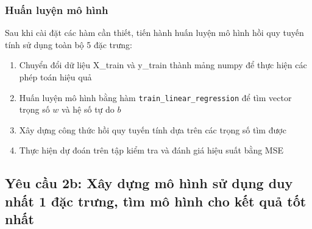 \subsubsection{Huấn luyện mô hình}
Sau khi cài đặt các hàm cần thiết, tiến hành huấn luyện mô hình hồi quy tuyến tính sử dụng toàn bộ 5 đặc trưng:

\begin{enumerate}
	\item Chuyển đổi dữ liệu X\_train và y\_train thành mảng numpy để thực hiện các phép toán hiệu quả
	\item Huấn luyện mô hình bằng hàm \texttt{train\_linear\_regression} để tìm vector trọng số \(w\) và hệ số tự do \(b\)
	\item Xây dựng công thức hồi quy tuyến tính dựa trên các trọng số tìm được
	\item Thực hiện dự đoán trên tập kiểm tra và đánh giá hiệu suất bằng MSE
\end{enumerate}

\subsection{Yêu cầu 2b: Xây dựng mô hình sử dụng duy nhất 1 đặc trưng, tìm mô hình cho kết quả tốt nhất}
